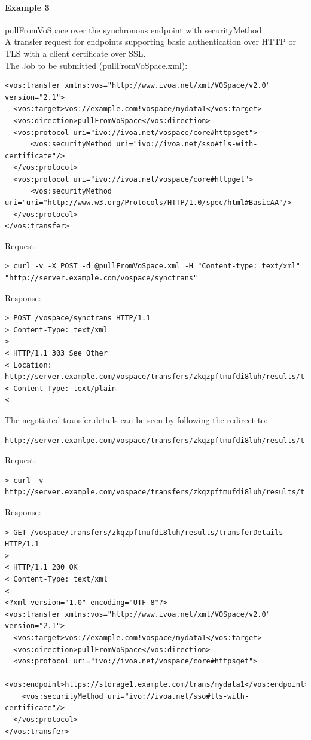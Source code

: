 \documentclass[11pt,a4paper]{ivoa}
\begin{document}
\paragraph{Example 3}
pullFromVoSpace over the synchronous endpoint with securityMethod
\\[5px]
\noindent
A transfer request for endpoints supporting basic authentication over HTTP or TLS with a client certificate over SSL.\\
The Job to be submitted (pullFromVoSpace.xml):
\begin{lstlisting}
<vos:transfer xmlns:vos="http://www.ivoa.net/xml/VOSpace/v2.0" version="2.1">
  <vos:target>vos://example.com!vospace/mydata1</vos:target>
  <vos:direction>pullFromVoSpace</vos:direction>
  <vos:protocol uri="ivo://ivoa.net/vospace/core#httpsget">
      <vos:securityMethod uri="ivo://ivoa.net/sso#tls-with-certificate"/>
  </vos:protocol>
  <vos:protocol uri="ivo://ivoa.net/vospace/core#httpget">
      <vos:securityMethod uri="uri="http://www.w3.org/Protocols/HTTP/1.0/spec/html#BasicAA"/>
  </vos:protocol>
</vos:transfer>
\end{lstlisting}
Request:
\begin{lstlisting}
> curl -v -X POST -d @pullFromVoSpace.xml -H "Content-type: text/xml" "http://server.example.com/vospace/synctrans"
\end{lstlisting}
Response:
\begin{lstlisting}
> POST /vospace/synctrans HTTP/1.1
> Content-Type: text/xml
>
< HTTP/1.1 303 See Other
< Location: http://server.example.com/vospace/transfers/zkqzpftmufdi8luh/results/transferDetails
< Content-Type: text/plain
<
\end{lstlisting}
The negotiated transfer details can be seen by following the redirect to:
\begin{lstlisting}
http://server.examlpe.com/vospace/transfers/zkqzpftmufdi8luh/results/transferDetails
\end{lstlisting}
Request:
\begin{lstlisting}
> curl -v http://server.example.com/vospace/transfers/zkqzpftmufdi8luh/results/transferDetails
\end{lstlisting}
Response:
\begin{lstlisting}
> GET /vospace/transfers/zkqzpftmufdi8luh/results/transferDetails HTTP/1.1
>
< HTTP/1.1 200 OK
< Content-Type: text/xml
<
<?xml version="1.0" encoding="UTF-8"?>
<vos:transfer xmlns:vos="http://www.ivoa.net/xml/VOSpace/v2.0" version="2.1">
  <vos:target>vos://example.com!vospace/mydata1</vos:target>
  <vos:direction>pullFromVoSpace</vos:direction>
  <vos:protocol uri="ivo://ivoa.net/vospace/core#httpsget">
    <vos:endpoint>https://storage1.example.com/trans/mydata1</vos:endpoint>
    <vos:securityMethod uri="ivo://ivoa.net/sso#tls-with-certificate"/>
  </vos:protocol>
</vos:transfer>
\end{lstlisting}
\end{document}
